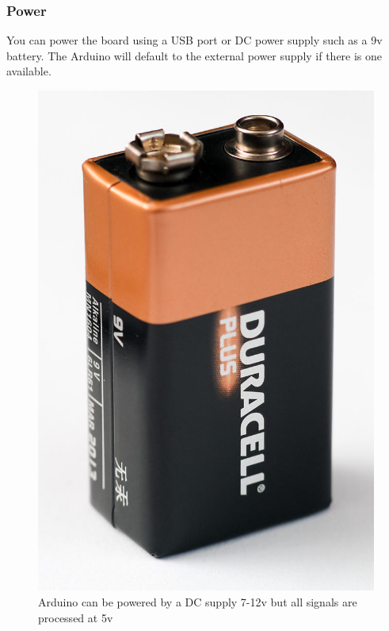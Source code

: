 \begin{frame}
  \frametitle{Power}
	You can power the board using a USB port or DC power supply such as a 9v battery. The Arduino will default to the external power supply if there is one available.   
	\begin{figure}
		\includegraphics[scale=.1]{assets/battery} 
		\caption{Arduino can be powered by a DC supply 7-12v but all signals are processed at 5v}
	\end{figure}
\end{frame}

